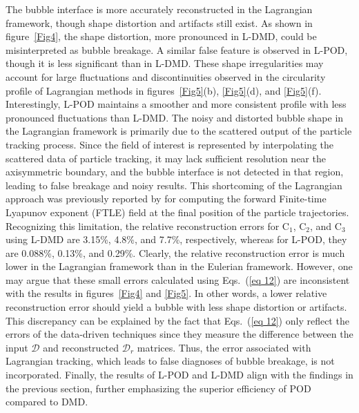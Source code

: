 \documentclass[a4paper,fleqn]{cas-sc}
\begin{document}
	The bubble interface is more accurately reconstructed in the Lagrangian framework, though shape distortion and artifacts still exist. As shown in figure~\ref{Fig4}, the shape distortion, more pronounced in L-DMD, could be misinterpreted as bubble breakage. A similar false feature is observed in L-POD, though it is less significant than in L-DMD. These shape irregularities may account for large fluctuations and discontinuities observed in the circularity profile of Lagrangian methods in figures~\ref{Fig5}(b), \ref{Fig5}(d), and \ref{Fig5}(f). Interestingly, L-POD maintains a smoother and more consistent profile with less pronounced fluctuations than L-DMD. The noisy and distorted bubble shape in the Lagrangian framework is primarily due to the scattered output of the particle tracking process. Since the field of interest is represented by interpolating the scattered data of particle tracking, it may lack sufficient resolution near the axisymmetric boundary, and the bubble interface is not detected in that region, leading to false breakage and noisy results. This shortcoming of the Lagrangian approach was previously reported by \citet{Haller2011} for computing the forward Finite-time Lyapunov exponent (FTLE) field at the final position of the particle trajectories. Recognizing this limitation, the relative reconstruction errors for C$_1$, C$_2$, and C$_3$ using L-DMD are 3.15\%, 4.8\%, and 7.7\%, respectively, whereas for L-POD, they are 0.088\%, 0.13\%, and 0.29\%. Clearly, the relative reconstruction error is much lower in the Lagrangian framework than in the Eulerian framework. However, one may argue that these small errors calculated using Eqs.~(\ref{eq 12}) are inconsistent with the results in figures~\ref{Fig4} and \ref{Fig5}. In other words, a lower relative reconstruction error should yield a bubble with less shape distortion or artifacts. This discrepancy can be explained by the fact that Eqs.~(\ref{eq 12}) only reflect the errors of the data-driven techniques since they measure the difference between the input $\mathcal{D}$ and reconstructed $\mathcal{D}_r$ matrices. Thus, the error associated with Lagrangian tracking, which leads to false diagnoses of bubble breakage, is not incorporated. Finally, the results of L-POD and L-DMD align with the findings in the previous section, further emphasizing the superior efficiency of POD compared to DMD.
	
\end{document}
